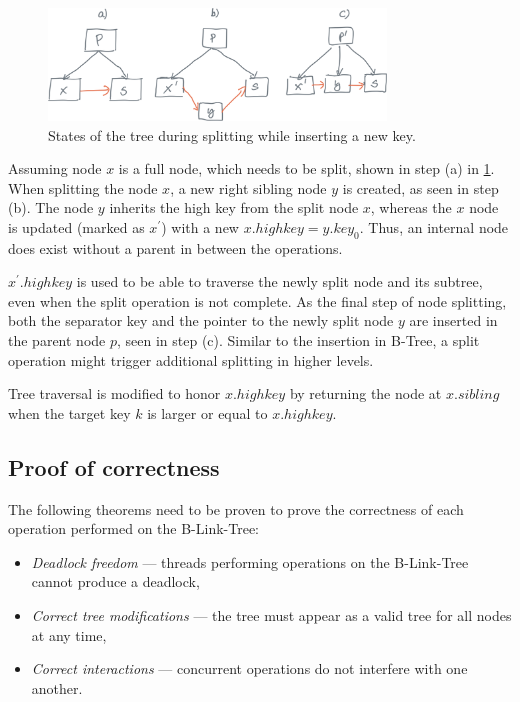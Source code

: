 \begin{figure}
  \centering
  \includegraphics[width=0.8\textwidth ]{components/figure/b-link-insert}
  \caption{States of the tree during splitting while inserting a new key.}
  \label{figure:b-link-insert}
\end{figure}

Assuming node $x$ is a full node, which needs to be split, shown in step (a) in \cref{figure:b-link-insert}. When splitting the node $x$, a new right sibling node $y$ is created, as seen in step (b). The node $y$ inherits the high key from the split node $x$, whereas the $x$ node is updated (marked as $x^\prime$) with a new $x.highkey = y.key_0$. Thus, an internal node does exist without a parent in between the operations.

$x^\prime.highkey$ is used to be able to traverse the newly split node and its subtree, even when the split operation is not complete. As the final step of node splitting, both the separator key and the pointer to the newly split node $y$ are inserted in the parent node $p$, seen in step (c). Similar to the insertion in B-Tree, a split operation might trigger additional splitting in higher levels.

Tree traversal is modified to honor $x.highkey$ by returning the node at $x.\mathit{sibling}$ when the target key $k$ is larger or equal to $x.highkey$.

\subsection{Proof of correctness}

The following theorems need to be proven to prove the correctness of each operation performed on the B-Link-Tree:

\begin{itemize}
  \item \textit{Deadlock freedom} --- threads performing operations on the B-Link-Tree cannot produce a deadlock,
  \item \textit{Correct tree modifications} --- the tree must appear as a valid tree for all nodes at any time,
  \item \textit{Correct interactions} --- concurrent operations do not interfere with one another.
\end{itemize}

